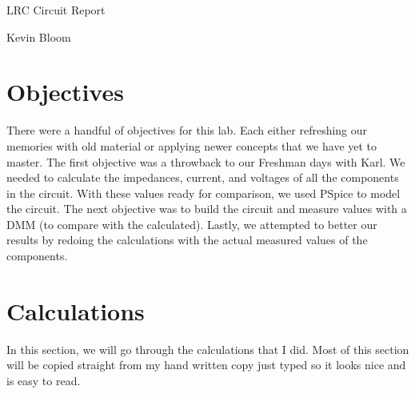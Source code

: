 \documentclass[12pt,a4paper,titlepage]{article}
\begin{document}
\pagestyle{headings}
\setcounter{page}{1}

\thispagestyle{empty}

\begin{flushleft}
\vspace*{1.5in}

{\huge LRC Circuit Report}

\vspace{0.25in}

{\Large Kevin Bloom}

\vspace{0.25in}

\vfill

\end{flushleft}

\newpage

\tableofcontents

\newpage

\section{Objectives}
There were a handful of objectives for this lab. Each either refreshing our
memories with old material or applying newer concepts that we have yet to
master. The first objective was a throwback to our Freshman days with Karl.
We needed to calculate the impedances, current, and voltages of all the
components in the circuit. With these values ready for comparison, we used
PSpice to model the circuit. The next objective was to build the circuit and
measure values with a DMM (to compare with the calculated). Lastly, 
we attempted to better our results by redoing the calculations with the actual
measured values of the components. 


\section{Calculations}
In this section, we will go through the calculations that I did. Most of this
section will be copied straight from my hand written copy just typed so it
looks nice and is easy to read.
\end{document}
